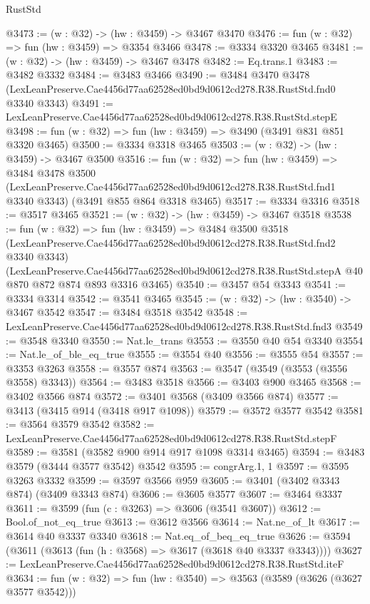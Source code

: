 \begin{lexlean}{RustStd}
\begin{coremodule}
@3473 := (w : @32) -> (hw : @3459) -> @3467 @3470
@3476 := fun (w : @32) => fun (hw : @3459) => @3354 @3466
@3478 := @3334 @3320 @3465
@3481 := (w : @32) -> (hw : @3459) -> @3467 @3478
@3482 := Eq.trans.{1}
@3483 := @3482 @3332
@3484 := @3483 @3466
@3490 := @3484
    @3470
    @3478
    (LexLeanPreserve.Cae4456d77aa62528ed0bd9d0612cd278.R38.RustStd.fnd0 @3340 @3343)
@3491 := LexLeanPreserve.Cae4456d77aa62528ed0bd9d0612cd278.R38.RustStd.stepE
@3498 := fun (w : @32) => fun (hw : @3459) => @3490 (@3491 @831 @851 @3320 @3465)
@3500 := @3334 @3318 @3465
@3503 := (w : @32) -> (hw : @3459) -> @3467 @3500
@3516 := fun (w : @32) =>
  fun (hw : @3459) =>
  @3484
    @3478
    @3500
    (LexLeanPreserve.Cae4456d77aa62528ed0bd9d0612cd278.R38.RustStd.fnd1 @3340 @3343)
    (@3491 @855 @864 @3318 @3465)
@3517 := @3334 @3316
@3518 := @3517 @3465
@3521 := (w : @32) -> (hw : @3459) -> @3467 @3518
@3538 := fun (w : @32) =>
  fun (hw : @3459) =>
  @3484
    @3500
    @3518
    (LexLeanPreserve.Cae4456d77aa62528ed0bd9d0612cd278.R38.RustStd.fnd2 @3340 @3343)
    (LexLeanPreserve.Cae4456d77aa62528ed0bd9d0612cd278.R38.RustStd.stepA
      @40
      @870
      @872
      @874
      @893
      @3316
      @3465)
@3540 := @3457 @54 @3343
@3541 := @3334 @3314
@3542 := @3541 @3465
@3545 := (w : @32) -> (hw : @3540) -> @3467 @3542
@3547 := @3484 @3518 @3542
@3548 := LexLeanPreserve.Cae4456d77aa62528ed0bd9d0612cd278.R38.RustStd.fnd3
@3549 := @3548 @3340
@3550 := Nat.le_trans
@3553 := @3550 @40 @54 @3340
@3554 := Nat.le_of_ble_eq_true
@3555 := @3554 @40
@3556 := @3555 @54
@3557 := @3353 @3263
@3558 := @3557 @874
@3563 := @3547 (@3549 (@3553 (@3556 @3558) @3343))
@3564 := @3483 @3518
@3566 := @3403 @900 @3465
@3568 := @3402 @3566 @874
@3572 := @3401 @3568 (@3409 @3566 @874)
@3577 := @3413 (@3415 @914 (@3418 @917 @1098))
@3579 := @3572 @3577 @3542
@3581 := @3564 @3579 @3542
@3582 := LexLeanPreserve.Cae4456d77aa62528ed0bd9d0612cd278.R38.RustStd.stepF
@3589 := @3581 (@3582 @900 @914 @917 @1098 @3314 @3465)
@3594 := @3483 @3579 (@3444 @3577 @3542) @3542
@3595 := congrArg.{1, 1}
@3597 := @3595 @3263 @3332
@3599 := @3597 @3566 @959
@3605 := @3401 (@3402 @3343 @874) (@3409 @3343 @874)
@3606 := @3605 @3577
@3607 := @3464 @3337
@3611 := @3599 (fun (c : @3263) => @3606 (@3541 @3607))
@3612 := Bool.of_not_eq_true
@3613 := @3612 @3566
@3614 := Nat.ne_of_lt
@3617 := @3614 @40 @3337 @3340
@3618 := Nat.eq_of_beq_eq_true
@3626 := @3594 (@3611 (@3613 (fun (h : @3568) => @3617 (@3618 @40 @3337 @3343))))
@3627 := LexLeanPreserve.Cae4456d77aa62528ed0bd9d0612cd278.R38.RustStd.iteF
@3634 := fun (w : @32) => fun (hw : @3540) => @3563 (@3589 (@3626 (@3627 @3577 @3542)))

\end{coremodule}
\end{lexlean}
